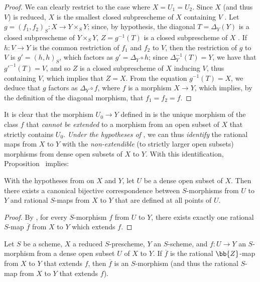 \begin{proof}
We can clearly restrict to the case where $X=U_1=U_2$.
Since $X$ (and thus $V$) is reduced, $X$ is the smallest closed subprescheme of $X$ containing $V$ .
Let $g=(f_1,f_2)_S:X\to Y\times_S Y$; since, by hypothesis, the diagonal $T=\Delta_Y(Y)$ is a closed subprescheme of $Y\times_S Y$, $Z=g^{-1}(T)$ is a closed subprescheme of $X$ .
If $h:V\to Y$ is the common restriction of $f_1$ and $f_2$ to $V$, then the restriction of $g$ to $V$ is $g'=(h,h)_S$, which factors as $g'=\Delta_Y\circ h$; since $\Delta_Y^{-1}(T)=Y$, we have that $g'^{-1}(T)=V$, and so $Z$ is a closed subprescheme of $X$ inducing $V$, thus containing $V$, which implies that $Z=X$.
From the equation $g^{-1}(T)=X$, we deduce  that $g$ factors as $\Delta_Y\circ f$, where $f$ is a morphism $X\to Y$, which implies, by the definition of the diagonal morphism, that $f_1=f_2=f$.
\end{proof}

It is clear that the morphism $U_0\to Y$ defined in  is the unique morphism of the class $f$ that \emph{cannot be extended} to a morphism from an open subset of $X$ that strictly contains $U_0$.
\emph{Under the hypotheses of }, we can thus \emph{identify} the rational maps from $X$ to $Y$ with the \emph{non-extendible} (to strictly larger open subsets) morphisms from dense open subsets of $X$ to $Y$.
With this identification, Proposition~ implies:
\begin{corollary}[7.2.3]
\label{I.7.2.3}
With the hypotheses from  on $X$ and $Y$, let $U$ be a dense open subset of $X$.
Then there exists a canonical bijective correspondence between $S$-morphisms from $U$ to $Y$ and rational $S$-maps from $X$ to $Y$ that are defined at all points of $U$.
\end{corollary}

\begin{proof}
By , for every $S$-morphism $f$ from $U$ to $Y$, there exists exactly one rational $S$-map $\overline{f}$ from $X$ to $Y$ which extends $f$.
\end{proof}

\begin{corollary}[7.2.4]
\label{I.7.2.4}
Let $S$ be a scheme, $X$ a reduced $S$-prescheme, $Y$ an $S$-scheme, and $f:U\to Y$ an $S$-morphism from a dense open subset $U$ of $X$ to $Y$.
If $\overline{f}$ is the rational $\bb{Z}$-map from $X$ to $Y$ that extends $f$, then $\overline{f}$ is an $S$-morphism (and thus the rational $S$-map from $X$ to $Y$ that extends $f$).
\end{corollary}

